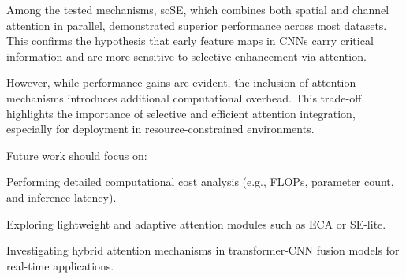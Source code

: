 \documentclass[pdflatex,sn-mathphys-num]{sn-jnl}%
\theoremstyle{thmstyleone}%
\theoremstyle{thmstyletwo}%
\theoremstyle{thmstylethree}%
\begin{document}
Among the tested mechanisms, scSE, which combines both spatial and channel attention in parallel, demonstrated superior performance across most datasets. This confirms the hypothesis that early feature maps in CNNs carry critical information and are more sensitive to selective enhancement via attention.

However, while performance gains are evident, the inclusion of attention mechanisms introduces additional computational overhead. This trade-off highlights the importance of selective and efficient attention integration, especially for deployment in resource-constrained environments.

Future work should focus on:

Performing detailed computational cost analysis (e.g., FLOPs, parameter count, and inference latency).

Exploring lightweight and adaptive attention modules such as ECA or SE-lite.

Investigating hybrid attention mechanisms in transformer-CNN fusion models for real-time applications.





\end{document}
